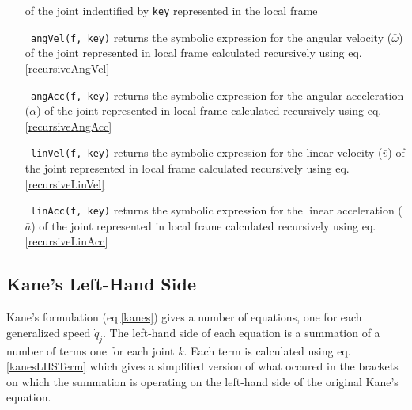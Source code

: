 \documentclass[a4paper,10pt]{article}
\begin{document}
\begin{itemize}[label={}]
 of the joint indentified by \texttt{key} represented in the local frame
 \item[\texttt{\relsize{-2} angVel(f, key)}] returns the symbolic expression for the angular velocity ($\bar\omega$) of the joint represented in local frame calculated
 recursively using eq. \ref{recursiveAngVel}
 \item[\texttt{\relsize{-2} angAcc(f, key)}] returns the symbolic expression for the angular acceleration ($\bar\alpha$) of the joint represented in local frame calculated
 recursively using eq. \ref{recursiveAngAcc}
 \item[\texttt{\relsize{-2} linVel(f, key)}] returns the symbolic expression for the linear velocity ($\bar{v}$) of the joint represented in local frame calculated
 recursively using eq. \ref{recursiveLinVel}
 \item[\texttt{\relsize{-2} linAcc(f, key)}] returns the symbolic expression for the linear acceleration ($\bar{a}$) of the joint represented in local frame calculated
 recursively using eq. \ref{recursiveLinAcc}
\end{itemize}

\subsection{Kane's Left-Hand Side}
Kane's formulation (eq.\ref{kanes}) gives a number of equations, one for each generalized speed $\dot{q}_j$. The left-hand side
of each equation is a summation of a number of terms one for each joint $k$. Each term is calculated using 
eq.\ref{kanesLHSTerm} which gives a simplified version of what occured in the brackets on which the summation
is operating on the left-hand side of the original Kane's equation.
\end{document}
